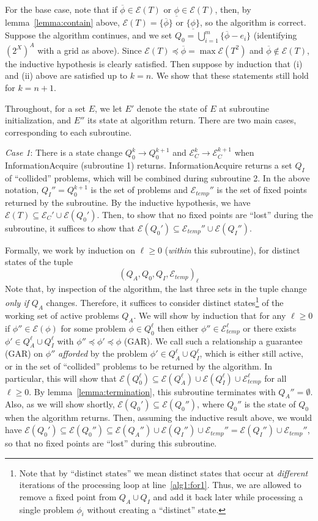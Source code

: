 \documentclass[11pt,reqno]{amsart}
\theoremstyle{definition}
\numberwithin{equation}{section}
\newcommand{\ol}{\overline}
\newcommand{\ul}{\underline}
\newcommand{\pre}{\phi}
\newcommand{\prealloc}{(2^X)^A}
\newcommand{\sub}{\subseteq}
\newcommand{\fix}{\mathcal{E}}
\newcommand{\peq}{\preceq}
\newcommand{\toppre}{\ol{\pre}}
\newcommand{\acto}{Q_0}
\newcommand{\actok}{Q_0^k}
\newcommand{\acta}{Q_A}
\newcommand{\actc}{Q_I}
\newcommand{\fixfind}{\mathcal{E}_C}
\newcommand{\fixfindk}{\mathcal{E}^k_C}
\newcommand{\fixfindkk}{\mathcal{E}^{k + 1}_C}
\newcommand{\fixtemp}{\mathcal{E}_{temp}}
\begin{document}
For the base case, note that if $\toppre \in \fix(T)$ or $\ul{\pre} \in \fix(T)$, then, by lemma~\ref{lemma:contain} above, $\fix(T) = \{\toppre\}$ or $\{\ul{\pre}\}$, so the algorithm is correct. 
Suppose the algorithm continues, and we set $\acto = \bigcup_{i = 1}^m \{\toppre - e_i\}$ (identifying $\prealloc$ with a grid as above).
Since $\fix(T) \peq \toppre = \max \fix(T^2)$ and $\toppre \not \in \fix(T)$, the inductive hypothesis is clearly satisfied. 
Then suppose by induction that (i) and (ii) above are satisfied up to $k = n$.
We show that these statements still hold for $k = n +1$.

Throughout, for a set $E$, we let $E'$ denote the state of $E$ at subroutine initialization, and $E''$ its state at algorithm return.
There are two main cases, corresponding to each subroutine.

\emph{Case 1}: There is a state change $\actok \to \acto^{k +1}$ and $\fixfindk \to \fixfindkk$ when InformationAcquire (subroutine 1) returns.
InformationAcquire returns a set $\actc$ of ``collided'' problems, which will be combined during subroutine 2.
In the above notation, $\actc'' = \acto^{k+1}$ is the set of problems and $\fixtemp''$ is the set of fixed points returned by the subroutine.
By the inductive hypothesis, we have $\fix(T) \sub \fixfind' \cup \fix(\acto')$.
Then, to show that no fixed points are ``lost'' during the subroutine, it suffices to show that $\fix(\acto') \sub \fixtemp'' \cup \fix(\actc'')$.

Formally, we work by induction on $\ell \geq 0$ (\emph{within} this subroutine), for distinct states of the tuple \[(\acta,\acto,\actc,\fixtemp)_{\ell}\]
Note that, by inspection of the algorithm, the last three sets in the tuple change \emph{only if} $\acta$ changes. 
Therefore, it suffices to consider distinct states\footnote{Note that by ``distinct states'' we mean distinct states that occur at \emph{different} iterations of the processing loop at line~\ref{alg1:for1}.
Thus, we are allowed to remove a fixed point from $\acta \cup \actc$ and add it back later while processing a single problem $\pre_i$ without creating a ``distinct'' state.} of the working set of active problems $\acta$.
We will show by induction that for any $\ell \geq 0$ if $\pre'' \in \fix(\pre)$ for some problem $\pre \in \acto^{\ell}$ then either $\pre'' \in \fixtemp^{\ell}$ or there exists $\pre' \in \acta^{\ell} \cup \actc^{\ell}$ with $\pre'' \peq \pre' \peq \pre$ (GAR).
We call such a relationship a guarantee (GAR) on $\pre''$ \emph{afforded} by the problem $\pre' \in \acta^{\ell} \cup \actc^{\ell}$, which is either still active, or in the set of ``collided'' problems to be returned by the algorithm.
In particular, this will show that $\fix(\acto^{\ell}) \sub \fix(\acta^{\ell}) \cup \fix(\actc^{\ell}) \cup \fixtemp^{\ell}$ for all $\ell \geq 0$.
By lemma~\ref{lemma:termination}, this subroutine terminates with $\acta'' = \emptyset$. 
Also, as we will show shortly, $\fix(\acto') \sub \fix(\acto'')$, where $\acto''$ is the state of $\acto$ when the algorithm returns. 
Then, assuming the inductive result above, we would have $\fix(\acto') \sub \fix(\acto'') \sub \fix(\acta'') \cup \fix(\actc'') \cup \fixtemp'' = \fix(\actc'') \cup \fixtemp''$, so that no fixed points are ``lost'' during this subroutine.
\end{document}
